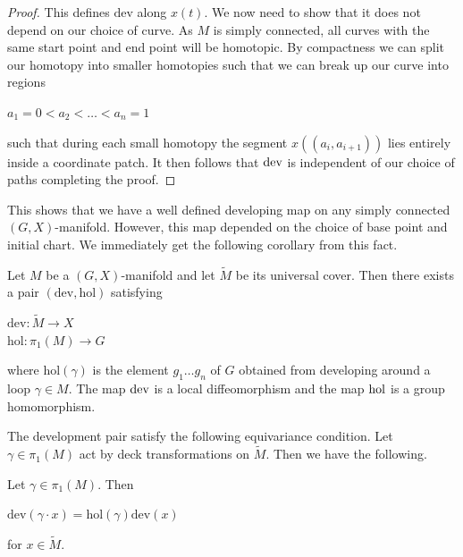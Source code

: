 \begin{proof}
    This defines $\text{dev}$ along $x(t)$. We now need to show that it does not
    depend on our choice of curve. As $M$ is simply connected, all curves with the
    same start point and end point will be homotopic. By compactness we can split
    our homotopy into smaller homotopies such that we can break up our curve into
    regions
    \begin{center}
        $a_1 =0 < a_2 < \dots < a_n=1$
    \end{center}
    such that during each small homotopy the segment $x((a_i, a_{i+1}))$ lies entirely inside a coordinate patch. It then follows that $\text{dev}$ is independent of our choice of paths completing the proof.

\end{proof}

This shows that we have a well defined developing map on any simply connected
$(G,X)$-manifold. However, this map depended on the choice of base point and
initial chart. We immediately get the following corollary from this fact.

\begin{corollary}
    Let $M$ be a $(G,X)$-manifold and let $\tilde{M}$ be its universal cover. Then
    there exists a pair $(\text{dev}, \text{hol})$ satisfying
    \begin{center}
        $\text{dev}: \tilde{M} \to X$\\
        $\text{hol}: \pi_1(M) \to G$
    \end{center}
    where $\text{hol}(\gamma)$ is the element $g_1\dots g_n$ of $G$ obtained from
    developing around a loop $\gamma \in M$. The map $\text{dev}$ is a local diffeomorphism and the map $\text{hol}$ is a group homomorphism.
\end{corollary}

The development pair satisfy the following equivariance condition. Let $\gamma
    \in \pi_1(M)$ act by deck transformations on $\tilde{M}$. Then we have the
following.
\begin{lemma}
    Let $\gamma \in \pi_1(M)$. Then

    \begin{center}
        $\text{dev}(\gamma \cdot x) = \text{hol}(\gamma)\text{dev}(x)$
    \end{center}
    for $x \in \tilde{M}$.
    \label{lemma:dev-equivariance}
\end{lemma}

